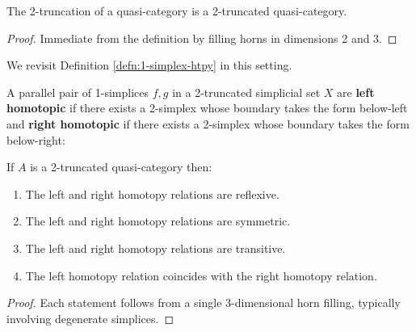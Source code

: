    \begin{lemma}\label{lem:2-truncated-qcat}
    \leanok
     The 2-truncation of a quasi-category is a 2-truncated quasi-category.
   \end{lemma}
   \begin{proof}
    \leanok
    Immediate from the definition by filling horns in dimensions 2 and 3.
   \end{proof}

   We revisit Definition \ref{defn:1-simplex-htpy} in this setting.

   \begin{definition}\label{defn:1-simplex-left-right-htpy}
     A parallel pair of 1-sim\-plices $f,g$ in a 2-truncated simplicial set $X$ are \textbf{left homotopic} if there exists a 2-simplex whose boundary takes the form below-left and \textbf{right homotopic} if there exists a 2-simplex whose boundary takes the form below-right:
     \begin{center}
     \end{center}     \begin{center}
    \end{center}
     \end{definition}

\begin{lemma}\label{lem:2-truncated-qcat-htpy}
   If $A$ is a 2-truncated quasi-category then:
  \begin{enumerate}
    \item The left and right homotopy relations are reflexive.
    \item The left and right homotopy relations are symmetric.
    \item The left and right homotopy relations are transitive.
    \item The left homotopy relation coincides with the right homotopy relation.
  \end{enumerate}
\end{lemma}
\begin{proof}
Each statement follows from a single 3-dimensional horn filling, typically involving degenerate simplices.
\end{proof}

